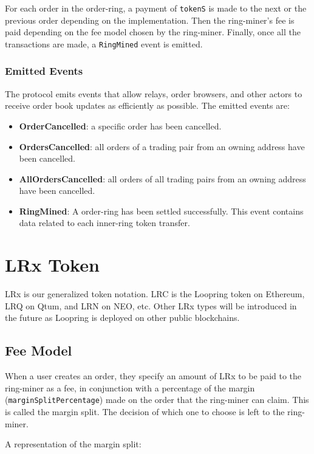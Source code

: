 \documentclass[UTF8,nofonts]{article}
\begin{document}
\begin{multicols}{2}
For each order in the order-ring, a payment of \verb|tokenS| is made to the next or the previous order depending on the implementation. Then the ring-miner's fee is paid depending on the fee model chosen by the ring-miner. Finally, once all the transactions are made, a \verb|RingMined| event is emitted.

\subsubsection{Emitted Events\label{sec:events}}

The protocol emits events that allow relays, order browsers, and other actors to receive order book updates as efficiently as possible. The emitted events are:

\begin{itemize}
	\item \textbf{OrderCancelled}: a specific order has been cancelled.
	\item \textbf{OrdersCancelled}: all orders of a trading pair from an owning address have been cancelled.
	\item \textbf{AllOrdersCancelled}: all orders of all trading pairs from an owning address have been cancelled.
	\item \textbf{RingMined}: A order-ring has been settled successfully. This event contains data related to each inner-ring token transfer.
\end{itemize}


\section{LRx Token\label{sec:token}}
LRx is our generalized token notation. LRC is the Loopring token on Ethereum, LRQ on Qtum, and LRN on NEO, etc. Other LRx types will be introduced in the future as Loopring is deployed on other public blockchains.

\subsection{Fee Model\label{sec:fee_model}} 
When a user creates an order, they specify an amount of LRx to be paid to the ring-miner as a fee, in conjunction with a percentage of the margin (\verb|marginSplitPercentage|) made on the order that the ring-miner can claim. This is called the margin split. The decision of which one to choose is left to the ring-miner.

A representation of the margin split:


\end{multicols}
\end{document}
